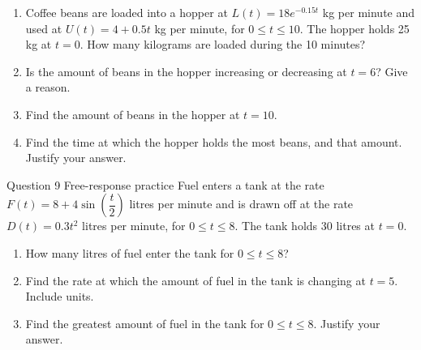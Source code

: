 \documentclass[11pt]{article}
\begin{document}
\begin{enumerate}[leftmargin=*,itemsep=2pt,start=5]
  \item Coffee beans are loaded into a hopper at $L(t)=18e^{-0.15t}$ kg per minute and used at $U(t)=4+0.5t$ kg per minute, for $0\le t\le10$. The hopper holds 25 kg at $t=0$. How many kilograms are loaded during the 10 minutes?\work{2.8cm}
  \item Is the amount of beans in the hopper increasing or decreasing at $t=6$? Give a reason.\work{2.8cm}
  \item Find the amount of beans in the hopper at $t=10$.\work{2.8cm}
  \item Find the time at which the hopper holds the most beans, and that amount. Justify your answer.\work{2.8cm}
\end{enumerate}

\begin{frbox}{Question 9 \textperiodcentered{} Free-response practice}
Fuel enters a tank at the rate $F(t)=8+4\sin\!\left(\dfrac t2\right)$ litres per minute and is drawn off at the rate $D(t)=0.3t^2$ litres per minute, for $0\le t\le8$. The tank holds 30 litres at $t=0$.
\begin{enumerate}[label=(\alph*),leftmargin=*,itemsep=2pt]
  \item How many litres of fuel enter the tank for $0\le t\le8$?\work{2.6cm}
  \item Find the rate at which the amount of fuel in the tank is changing at $t=5$. Include units.\work{2.6cm}
  \item Find the greatest amount of fuel in the tank for $0\le t\le8$. Justify your answer.\work{2.6cm}
\end{enumerate}
\end{frbox}
\end{document}
